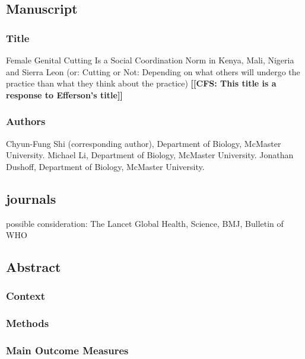 \documentclass[12pt,]{article}
\date{}
\newcommand{\comment}[1]{\textbf{[[#1]]}}
\newcommand{\cfcmt}[1]{\comment{CFS: #1}}
\begin{document}
\subsection{Manuscript}\label{manuscript}

\subsubsection{Title}\label{title}

Female Genital Cutting Is a Social Coordination Norm in Kenya, Mali, Nigeria and Sierra Leon
(or:  Cutting or Not:  Depending on what others will undergo the practice than what they think about the practice)
\cfcmt{This title is a response to Efferson’s title}

\subsubsection{Authors}\label{authors}

Chyun-Fung Shi (corresponding author), Department of Biology, McMaster
University. Michael Li, Department of Biology, McMaster University.
Jonathan Dushoff, Department of Biology, McMaster
University.

\subsection{journals}\label{journals}
possible consideration:  The Lancet Global Health, Science, BMJ, Bulletin of WHO

\subsection{Abstract}\label{abstract}

\subsubsection{Context}\label{context}

\subsubsection{}\label{objective}

\subsubsection{Methods}\label{Methods}

\subsubsection{Main Outcome Measures}\label{main-outcome-measures}
\end{document}
